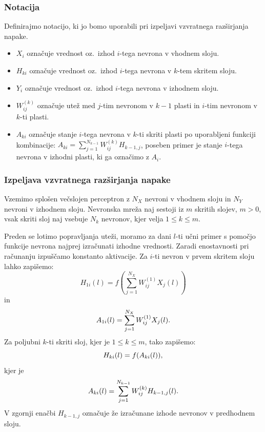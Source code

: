 \documentclass[mat1]{fmfdelo}
\begin{document}
\subsubsection{Notacija}
Definirajmo notacijo, ki jo bomo uporabili pri izpeljavi vzvratnega razširjanja napake. 
\begin{itemize}
\item $X_{i}$ označuje vrednost oz.\ izhod $i$-tega nevrona v vhodnem sloju.
\item $H_{ki}$ označuje vrednost oz.\ izhod $i$-tega nevrona v $k$-tem skritem sloju. 
\item $Y_i$ označuje vrednost oz.\ izhod $i$-tega nevrona v izhodnem sloju.
\item $W^{(k)}_{ij}$ označuje utež med $j$-tim nevronom v  $k-1$ plasti in $i$-tim nevronom v $k$-ti plasti.
\item $A_{ki}$ označuje stanje $i$-tega nevrona v $k$-ti skriti plasti po uporabljeni funkciji kombinacije: $A_{ki} = \sum^{N_{k-1}}_{j=1}W^{(k)}_{ij}H_{k-1,j}$, poseben primer je stanje $i$-tega nevrona v izhodni plasti, ki ga označimo z $A_i$.
\end{itemize}

\subsubsection{Izpeljava vzvratnega razširjanja napake}
Vzemimo splošen večslojen perceptron z $N_X$ nevroni v vhodnem sloju in $N_Y$ nevroni v izhodnem sloju. Nevronska mreža naj sestoji iz $m$ skritih slojev, $m>0$, vsak skriti sloj naj vsebuje $N_k$ nevronov, kjer velja $1\leq k \leq m$. 

Preden se lotimo popravljanja uteži, moramo za dani $l$-ti učni primer s pomočjo funkcije nevrona najprej izračunati izhodne vrednosti. Zaradi enostavnosti pri računanju izpuščamo konstanto aktivacije. Za $i$-ti nevron v prvem skritem sloju lahko zapišemo:
%
\begin{equation*}
H_{1i}(l) = f\left( \sum^{N_X}_{j=1}{W^{(1)}_{ij}X_j(l)}\right)
\end{equation*}
%
in
%
\begin{equation*}
A_{1i}(l) =\sum^{N_X}_{j=1}{W^{(1)}_{ij}X_j(l)}\text.
\end{equation*}
%
Za poljubni $k$-ti skriti sloj, kjer je $1\leq k \leq m$, tako zapišemo:
%
\begin{equation*}
H_{ki}(l) = f(A_{ki}(l))\text,
\end{equation*}
%
kjer je
%
\begin{equation*}
A_{ki}(l) = \sum^{N_{k-1}}_{j=1}W^{(k)}_{ij}H_{k-1,j}(l)\text.
\end{equation*}
%
V zgornji enačbi $H_{k-1,j}$ označuje že izračunane izhode nevronov v predhodnem sloju.
 
\end{document}
